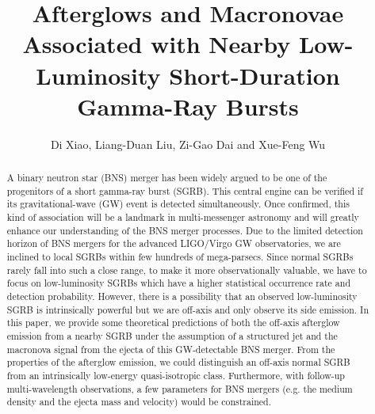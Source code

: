 \documentclass{emulateapj}
\begin{document}
\title{Afterglows and Macronovae Associated with Nearby Low-Luminosity Short-Duration Gamma-Ray Bursts}%
\author{Di Xiao, Liang-Duan Liu, Zi-Gao Dai and Xue-Feng Wu}


\begin{abstract}
A binary neutron star (BNS) merger has been widely argued to be one of the progenitors of a short gamma-ray burst (SGRB). This central engine can be verified if its gravitational-wave (GW) event is detected simultaneously. Once confirmed, this kind of association will be a landmark in multi-messenger astronomy and will greatly enhance our understanding of the BNS merger processes. Due to the limited detection horizon of BNS mergers for the advanced LIGO/Virgo GW observatories, we are inclined to local SGRBs within few hundreds of mega-parsecs. Since normal SGRBs rarely fall into such a close range, to make it more observationally valuable, we have to focus on low-luminosity SGRBs which have a higher statistical occurrence rate and detection probability. However, there is a possibility that an observed low-luminosity SGRB is intrinsically powerful but we are off-axis and only observe its side emission. In this paper, we provide some theoretical predictions of both the off-axis afterglow emission from a nearby SGRB under the assumption of a structured jet and the macronova signal from the ejecta of this GW-detectable BNS merger. From the properties of the afterglow emission, we could distinguish an off-axis normal SGRB from an intrinsically low-energy quasi-isotropic class. Furthermore, with follow-up multi-wavelength observations, a few parameters for BNS mergers (e.g. the medium density and the ejecta mass and velocity) would be constrained.
\end{abstract}
\end{document}
